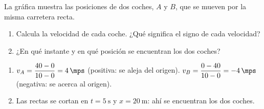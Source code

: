 \begin{exercise}
    La gráfica muestra las posiciones de dos coches, \(A\) y \(B\), que se mueven por la misma carretera recta.
    \begin{center}
    \end{center}
    \begin{enumerate}[label=\letraminuscula]
        \item Calcula la velocidad de cada coche. ¿Qué significa el signo de cada velocidad?
        \item ¿En qué instante y en qué posición se encuentran los dos coches?
    \end{enumerate}
    \begin{solu}
        \begin{enumerate}[label=\alph*)]
            \item \(v_A = \dfrac{40 - 0}{10 - 0} = \qty{4}{\mps}\) (positiva: se aleja del origen). \(v_B = \dfrac{0 - 40}{10 - 0} = \qty{-4}{\mps}\) (negativa: se acerca al origen).
            \item Las rectas se cortan en \(t = \qty{5}{\s}\) y \(x = \qty{20}{\m}\): ahí se encuentran los dos coches.
        \end{enumerate}
    \end{solu}
\end{exercise}

